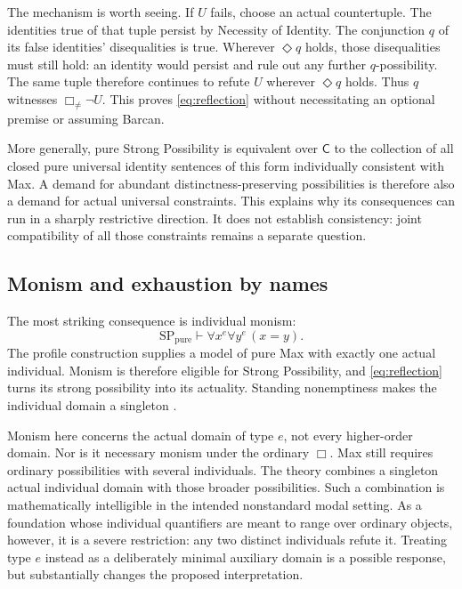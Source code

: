 \documentclass[12pt,letterpaper]{article}
\newcommand{\C}{\mathsf C}
\begin{document}
The mechanism is worth seeing. If $U$ fails, choose an actual countertuple. The identities true of that tuple persist by Necessity of Identity. The conjunction $q$ of its false identities' disequalities is true. Wherever $\Diamond q$ holds, those disequalities must still hold: an identity would persist and rule out any further $q$-possibility. The same tuple therefore continues to refute $U$ wherever $\Diamond q$ holds. Thus $q$ witnesses $\Box_{\ne}\neg U$. This proves \eqref{eq:reflection} without necessitating an optional premise or assuming Barcan.

More generally, pure Strong Possibility is equivalent over $\C$ to the collection of all closed pure universal identity sentences of this form individually consistent with Max. A demand for abundant distinctness-preserving possibilities is therefore also a demand for actual universal constraints. This explains why its consequences can run in a sharply restrictive direction. It does not establish consistency: joint compatibility of all those constraints remains a separate question.

\subsection{Monism and exhaustion by names}

The most striking consequence is individual monism:
\begin{equation}\label{eq:monism}
 \mathrm{SP}_{\mathrm{pure}}\vdash
 \forall x^e\forall y^e\,(x=y).
\end{equation}
The profile construction supplies a model of pure Max with exactly one actual individual. Monism is therefore eligible for Strong Possibility, and \eqref{eq:reflection} turns its strong possibility into its actuality. Standing nonemptiness makes the individual domain a singleton \citep[\S10]{spsignature}.

Monism here concerns the actual domain of type $e$, not every higher-order domain. Nor is it necessary monism under the ordinary $\Box$. Max still requires ordinary possibilities with several individuals. The theory combines a singleton actual individual domain with those broader possibilities. Such a combination is mathematically intelligible in the intended nonstandard modal setting. As a foundation whose individual quantifiers are meant to range over ordinary objects, however, it is a severe restriction: any two distinct individuals refute it. Treating type $e$ instead as a deliberately minimal auxiliary domain is a possible response, but substantially changes the proposed interpretation.
\end{document}
